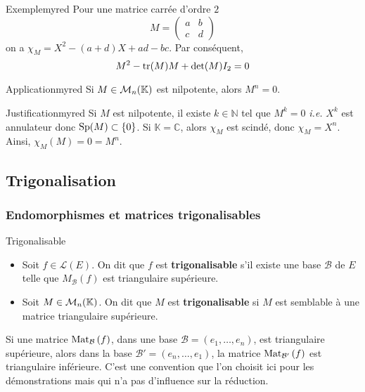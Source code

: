     \begin{omed}{Exemple}{myred}
        Pour une matrice carrée d’ordre $2$ 
        \[ M = \begin{pmatrix}
            a & b \\
            c & d
        \end{pmatrix} \]  
        on a $\chi_M = X^2 - (a+d)X + ad - bc$. Par conséquent, 
        \[ M^2 - \operatorname{tr}(M) M + \operatorname{det}(M) I_2 = 0 \]
    \end{omed}

    \begin{omed}{Application}{myred}
        Si $M \in \mathcal{M}_{n}(\mathbb{K})$ est nilpotente, alors $M^n = 0$.
    \end{omed}

    \begin{demo}{Justification}{myred}
        Si $M$ est nilpotente, il existe $k \in \mathbb{N}$ tel que $M^k = 0$ \textit{i.e.} $X^k$ est annulateur donc $\operatorname{Sp}(M) \subset \left\{0\right\}$. Si $\mathbb{K} = \mathbb{C}$, alors $\chi_M$ est scindé, donc $\chi_M = X^n$. Ainsi, $\chi_M(M) = 0 = M^n$.
    \end{demo}

\subsection{Trigonalisation}    

    \subsubsection{Endomorphismes et matrices trigonalisables}

    \begin{defi}{Trigonalisable}{}
        \begin{itemize}
            \item Soit $f \in \mathcal{L}(E)$. On dit que $f$ est \textbf{trigonalisable} s’il existe une base $\mathcal{B}$ de $E$ telle que $M_{\mathcal{B}}(f)$ est triangulaire supérieure.
            \item Soit $M \in \mathcal{M}_{n}(\mathbb{K})$. On dit que $M$ est \textbf{trigonalisable} si $M$ est semblable à une matrice triangulaire supérieure.
        \end{itemize}
    \end{defi}

    Si une matrice $\text{Mat}_{\mathcal{B}}\left(f\right)$, dans une base $\mathcal{B} = (e_1, \ldots, e_n)$, est triangulaire supérieure, alors dans la base $\mathcal{B}' = (e_n, \ldots, e_1)$, la matrice $\text{Mat}_{\mathcal{B}'}\left(f\right)$ est triangulaire inférieure. C’est une convention que l’on choisit ici pour les démonstrations mais qui n’a pas d’influence sur la réduction.

